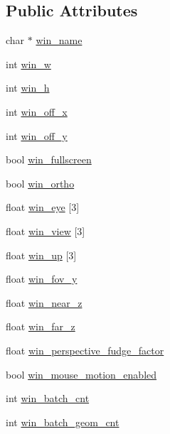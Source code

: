 \subsection*{Public Attributes}
\begin{DoxyCompactItemize}
\item 
char $\ast$ \mbox{\hyperlink{classConfig_ab8b6a8502f32d876da0cc45f15f25572}{win\+\_\+name}}
\item 
int \mbox{\hyperlink{classConfig_a82c36877b6bfae4bc2fc7f1333798b96}{win\+\_\+w}}
\item 
int \mbox{\hyperlink{classConfig_a7a29a3d11bb7eee70a01bacc447feb76}{win\+\_\+h}}
\item 
int \mbox{\hyperlink{classConfig_a8eeac8399b45e863fb7e08979ac97145}{win\+\_\+off\+\_\+x}}
\item 
int \mbox{\hyperlink{classConfig_a18dd382eb538b8bbcd86af1a94a546a3}{win\+\_\+off\+\_\+y}}
\item 
bool \mbox{\hyperlink{classConfig_adef2e048adc4226474728a6c6f18d2cc}{win\+\_\+fullscreen}}
\item 
bool \mbox{\hyperlink{classConfig_a736de212c0ec088d9308d762aa2166e2}{win\+\_\+ortho}}
\item 
float \mbox{\hyperlink{classConfig_a14c89e66100e4e2953f4b595e626be6f}{win\+\_\+eye}} \mbox{[}3\mbox{]}
\item 
float \mbox{\hyperlink{classConfig_a002d3676f26f2ec2b32e7f396d747d36}{win\+\_\+view}} \mbox{[}3\mbox{]}
\item 
float \mbox{\hyperlink{classConfig_aa5c6359b9d2ae82448d1e5b1c8bcb16d}{win\+\_\+up}} \mbox{[}3\mbox{]}
\item 
float \mbox{\hyperlink{classConfig_aab95e5e9b1188effc96301a8668cf976}{win\+\_\+fov\+\_\+y}}
\item 
float \mbox{\hyperlink{classConfig_aedfdcf7e3690e20a7e696104f17cc0d2}{win\+\_\+near\+\_\+z}}
\item 
float \mbox{\hyperlink{classConfig_a36f692f35dd23a6cb1349d42432eaa6b}{win\+\_\+far\+\_\+z}}
\item 
float \mbox{\hyperlink{classConfig_a5f8ec30c9b2a1d7f1838a73c33bc26d9}{win\+\_\+perspective\+\_\+fudge\+\_\+factor}}
\item 
bool \mbox{\hyperlink{classConfig_ade1442ccfe24fe5ab4ab0ff1a9c841fe}{win\+\_\+mouse\+\_\+motion\+\_\+enabled}}
\item 
int \mbox{\hyperlink{classConfig_addbfa64bd5828baa1043bc8abaecdd26}{win\+\_\+batch\+\_\+cnt}}
\item 
int \mbox{\hyperlink{classConfig_acc953ef8c53c07b8f582cc740c087d00}{win\+\_\+batch\+\_\+geom\+\_\+cnt}}

\end{DoxyCompactItemize}
